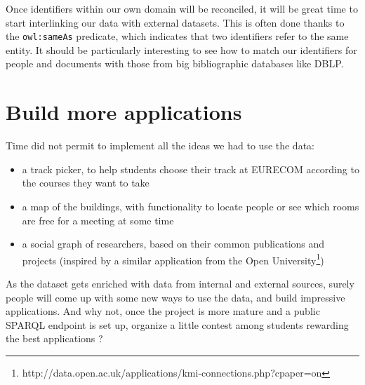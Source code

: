 \documentclass[a4paper,11pt]{report}
\begin{document}
Once identifiers within our own domain will be reconciled, it will be great time to start interlinking our data with external datasets. This is often done thanks to the \texttt{owl:sameAs} predicate, which indicates that two identifiers refer to the same entity. It should be particularly interesting to see how to match our identifiers for people and documents with those from big bibliographic databases like DBLP. 

\section*{Build more applications}
Time did not permit to implement all the ideas we had to use the data:
\begin{itemize}
\item a track picker, to help students choose their track at \mbox{EURECOM} according to the courses they want to take
\item a map of the buildings, with functionality to locate people or see which rooms are free for a meeting at some time
\item a social graph of researchers, based on their common publications and projects (inspired by a similar application from the Open University\footnote{http://data.open.ac.uk/applications/kmi-connections.php?cpaper=on})
\end{itemize}
As the dataset gets enriched with data from internal and external sources, surely people will come up with some new ways to use the data, and build impressive applications. And why not, once the project is more mature and a public SPARQL endpoint is set up, organize a little contest among students rewarding the best applications ? 

\cleardoublepage
{}


\appendix
\cleardoublepage
{}

%
\end{document}
